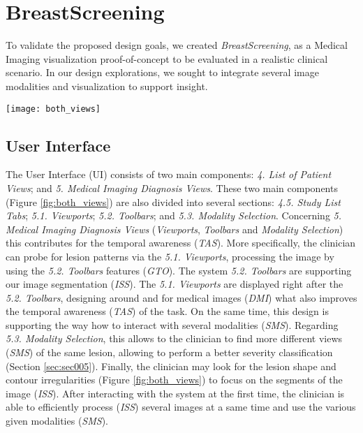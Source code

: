 \section{BreastScreening}
\label{sec:sec004}
To validate the proposed design goals, we created \textit{BreastScreening}, as a Medical Imaging visualization proof-of-concept to be evaluated in a realistic clinical scenario.
In our design explorations, we sought to integrate several image modalities and visualization to support insight.

\begin{figure*}[htbp]
\centering
\texttt{[image: both\_views]}
\caption{\scriptsize \textit{Single-Modality} (left) and \textit{Multi-Modality} (right) Views. The UI components are as follows: \textit{4. List of Patient Views}; and \textit{4.5. Study List Tabs}; as well as \textit{5. Medical Imaging Diagnosis Views}; \textit{5.1. Viewports}; \textit{5.2. Toolbars}; and \textit{5.3. Modality Selection}.}
\label{fig:both_views}
\end{figure*}

\subsection{User Interface}

The User Interface (UI) consists of two main components:
\textit{4. List of Patient Views}; and
\textit{5. Medical Imaging Diagnosis Views}.
These two main components (Figure \ref{fig:both_views}) are also divided into several sections:
\textit{4.5. Study List Tabs};
\textit{5.1. Viewports};
\textit{5.2. Toolbars}; and
\textit{5.3. Modality Selection}.
Concerning \textit{5. Medical Imaging Diagnosis Views} ({\em Viewports}, {\em Toolbars} and {\em Modality Selection}) this contributes for the temporal awareness (\textit{TAS}).
More specifically, the clinician can probe for lesion patterns via the \textit{5.1. Viewports}, processing the image by using the \textit{5.2. Toolbars} features (\textit{GTO}).
The system \textit{5.2. Toolbars} are supporting our image segmentation (\textit{ISS}).
The \textit{5.1. Viewports} are displayed right after the \textit{5.2. Toolbars}, designing around and for medical images (\textit{DMI}) what also improves the temporal awareness (\textit{TAS}) of the task.
On the same time, this design is supporting the way how to interact with several modalities (\textit{SMS}).
Regarding \textit{5.3. Modality Selection}, this allows to the clinician to find more different views (\textit{SMS}) of the same lesion, allowing to perform a better severity classification (Section \ref{sec:sec005}).
Finally, the clinician may look for the lesion shape and contour irregularities (Figure \ref{fig:both_views}) to focus on the segments of the image (\textit{ISS}).
After interacting with the system at the first time, the clinician is able to efficiently process (\textit{ISS}) several images at a same time and use the various given modalities (\textit{SMS}).

